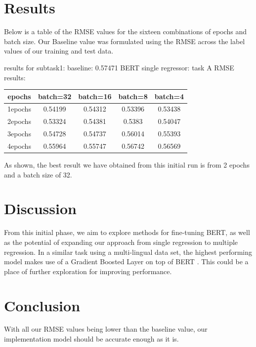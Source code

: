\documentclass{article}
\begin{document}
\section{Results}

Below is a table of the RMSE values for the sixteen combinations of epochs and batch size. Our Baseline value was formulated using the RMSE across the label values of our training and test data.

results for subtask1:
baseline: 0.57471
BERT single regressor:
task A RMSE results:
\begin{center}
\begin{tabular}{|c|c|c|c|c|}
\hline
epochs & batch=32 & batch=16 & batch=8 & batch=4 \\
\hline
1epochs & 0.54199 & 0.54312 & 0.53396 & 0.53438 \\
2epochs & 0.53324 & 0.54381 & 0.5383 & 0.54047 \\
3epochs & 0.54728 & 0.54737 & 0.56014 & 0.55393 \\
4epochs & 0.55964 & 0.55747 & 0.56742 & 0.56569 \\
\hline
\end{tabular}
\end{center}

As shown, the best result we have obtained from this initial run is from 2 epochs and a batch size of 32.

\section{Discussion}

From this initial phase, we aim to explore methods for fine-tuning BERT, as well as the potential of expanding our approach from single regression to multiple regression. In a similar task using a multi-lingual data set, the highest performing model makes use of a Gradient Boosted Layer on top of BERT \cite{Ismailov2019HumorAB}. This could be a place of further exploration for improving performance.

\section{Conclusion}

With all our RMSE values being lower than the baseline value, our implementation model should be accurate enough as it is.



\end{document}
